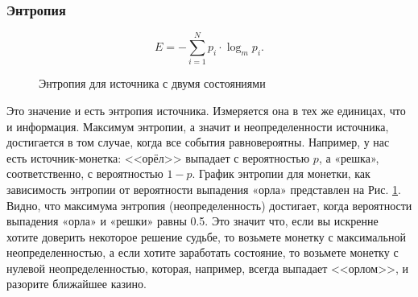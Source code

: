 \begin{frame}
\frametitle{Энтропия}
\begin{equation}
    E=-\sum_{i=1}^{N}p_{i}\cdot \log_{m}p_i.
    \label{eq:e}
\end{equation}
\begin{figure}
    \begin{center}
    \end{center}
    \caption{Энтропия для источника с двумя состояниями}\label{pict:ecoin}
\end{figure} 
\end{frame}

Это значение и есть энтропия источника. Измеряется она в тех же единицах, что и информация. Максимум энтропии, а значит и неопределенности источника, достигается в том случае, когда все события равновероятны. Например, у нас есть источник-монетка: <<орёл>> выпадает с вероятностью $p$, а «решка», соответственно, с вероятностью $1-p$. График энтропии для монетки, как зависимость энтропии от вероятности выпадения «орла» представлен на Рис. \ref{pict:ecoin}. Видно, что максимума энтропия (неопределенность) достигает, когда вероятности выпадения «орла» и «решки» равны 0.5. Это значит что, если вы искренне хотите доверить некоторое решение судьбе, то возьмете монетку с максимальной неопределенностью, а если хотите заработать состояние, то возьмете монетку с нулевой неопределенностью, которая, например, всегда выпадает <<орлом>>, и разорите ближайшее казино.

